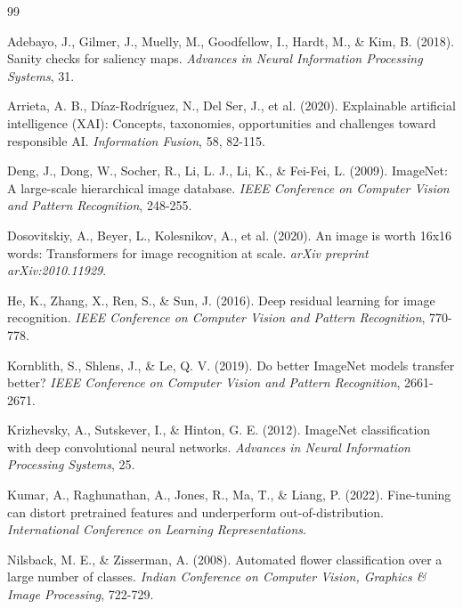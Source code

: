 \documentclass[11pt,a4paper]{article}
\begin{document}

\begin{thebibliography}{99}

Adebayo, J., Gilmer, J., Muelly, M., Goodfellow, I., Hardt, M., \& Kim, B. (2018).
Sanity checks for saliency maps.
\textit{Advances in Neural Information Processing Systems}, 31.

Arrieta, A. B., Díaz-Rodríguez, N., Del Ser, J., et al. (2020).
Explainable artificial intelligence (XAI): Concepts, taxonomies, opportunities and challenges toward responsible AI.
\textit{Information Fusion}, 58, 82-115.

Deng, J., Dong, W., Socher, R., Li, L. J., Li, K., \& Fei-Fei, L. (2009).
ImageNet: A large-scale hierarchical image database.
\textit{IEEE Conference on Computer Vision and Pattern Recognition}, 248-255.

Dosovitskiy, A., Beyer, L., Kolesnikov, A., et al. (2020).
An image is worth 16x16 words: Transformers for image recognition at scale.
\textit{arXiv preprint arXiv:2010.11929}.

He, K., Zhang, X., Ren, S., \& Sun, J. (2016).
Deep residual learning for image recognition.
\textit{IEEE Conference on Computer Vision and Pattern Recognition}, 770-778.

Kornblith, S., Shlens, J., \& Le, Q. V. (2019).
Do better ImageNet models transfer better?
\textit{IEEE Conference on Computer Vision and Pattern Recognition}, 2661-2671.

Krizhevsky, A., Sutskever, I., \& Hinton, G. E. (2012).
ImageNet classification with deep convolutional neural networks.
\textit{Advances in Neural Information Processing Systems}, 25.

Kumar, A., Raghunathan, A., Jones, R., Ma, T., \& Liang, P. (2022).
Fine-tuning can distort pretrained features and underperform out-of-distribution.
\textit{International Conference on Learning Representations}.

Nilsback, M. E., \& Zisserman, A. (2008).
Automated flower classification over a large number of classes.
\textit{Indian Conference on Computer Vision, Graphics \& Image Processing}, 722-729.


\end{thebibliography}
\end{document}
